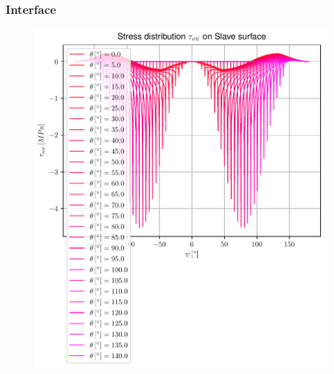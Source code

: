 \documentclass[first,firstsupp,lastsupp,handout,last,hyperref,table]{ETHclass}
\begin{document}
\begin{frame}
\frametitle{\vspace{0.35cm}\scriptsize Interface}
\vspace{-0.85cm}
\begin{figure}
\includegraphics[height=0.9\textheight]{2017-03-03_AbqRunSummary_AllInPlaneShearOnSlave.pdf}
\end{figure}
\end{frame}
\end{document}
